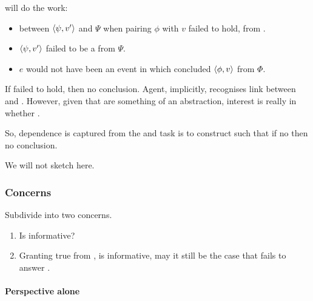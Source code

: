 \begin{note}
   will do the work:

  \begin{itemize}
  \item
     between \(\langle \psi, v' \rangle\) and \(\Psi\) when pairing \(\phi\) with \(v\) failed to hold, from .
  \item
    \(\langle \psi, v' \rangle\) failed to be a \fc{} from \(\Psi\).
  \item
    \(e\) would not have been an event in which \vAgent{} concluded \(\langle \phi, v \rangle\) from \(\Phi\).
  \end{itemize}

  If \fc{} failed to hold, then no conclusion.
  Agent, implicitly, recognises link between  and .
  However, given that  are something of an abstraction, interest is really in whether \fc{}.

  So, dependence is captured from the \agpe{} and task is to construct  such that if no  then no conclusion.

  We will not sketch  here.
\end{note}

\subsubsection{Concerns}
\label{sec:pitfalls}

\begin{note}
  Subdivide into two concerns.

  \begin{enumerate}
  \item
    Is \agpe{} informative?
  \item
    Granting true from \agpe{}, is informative, may it still be the case that \ros{} fails to answer \qWhyVnP{}.
  \end{enumerate}
\end{note}

\paragraph{Perspective alone}

